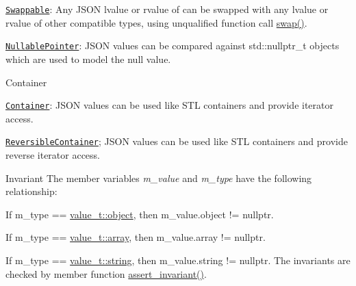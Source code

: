 \begin{DoxyItemize}
\begin{DoxyItemize}
\item \href{https://en.cppreference.com/w/cpp/named_req/Swappable}{\tt Swappable}\+: Any J\+S\+ON lvalue or rvalue of can be swapped with any lvalue or rvalue of other compatible types, using unqualified function call \hyperlink{classnlohmann_1_1basic__json_a94295a06e0e7b3867fe83afbee4cb202}{swap()}.
\item \href{https://en.cppreference.com/w/cpp/named_req/NullablePointer}{\tt Nullable\+Pointer}\+: J\+S\+ON values can be compared against {\ttfamily std\+::nullptr\+\_\+t} objects which are used to model the {\ttfamily null} value.
\end{DoxyItemize}
\item Container
\begin{DoxyItemize}
\item \href{https://en.cppreference.com/w/cpp/named_req/Container}{\tt Container}\+: J\+S\+ON values can be used like S\+TL containers and provide iterator access.
\item \href{https://en.cppreference.com/w/cpp/named_req/ReversibleContainer}{\tt Reversible\+Container}; J\+S\+ON values can be used like S\+TL containers and provide reverse iterator access.
\end{DoxyItemize}
\end{DoxyItemize}

\begin{DoxyInvariant}{Invariant}
The member variables {\itshape m\+\_\+value} and {\itshape m\+\_\+type} have the following relationship\+:
\begin{DoxyItemize}
\item If {\ttfamily m\+\_\+type == \hyperlink{namespacenlohmann_1_1detail_a1ed8fc6239da25abcaf681d30ace4985aa8cfde6331bd59eb2ac96f8911c4b666}{value\+\_\+t\+::object}}, then {\ttfamily m\+\_\+value.\+object != nullptr}.
\item If {\ttfamily m\+\_\+type == \hyperlink{namespacenlohmann_1_1detail_a1ed8fc6239da25abcaf681d30ace4985af1f713c9e000f5d3f280adbd124df4f5}{value\+\_\+t\+::array}}, then {\ttfamily m\+\_\+value.\+array != nullptr}.
\item If {\ttfamily m\+\_\+type == \hyperlink{namespacenlohmann_1_1detail_a1ed8fc6239da25abcaf681d30ace4985ab45cffe084dd3d20d928bee85e7b0f21}{value\+\_\+t\+::string}}, then {\ttfamily m\+\_\+value.\+string != nullptr}. The invariants are checked by member function \hyperlink{classnlohmann_1_1basic__json_aa7e7b1bdb6e9dbcfa5e284e8a2fb6464}{assert\+\_\+invariant()}.
\end{DoxyItemize}
\end{DoxyInvariant}


